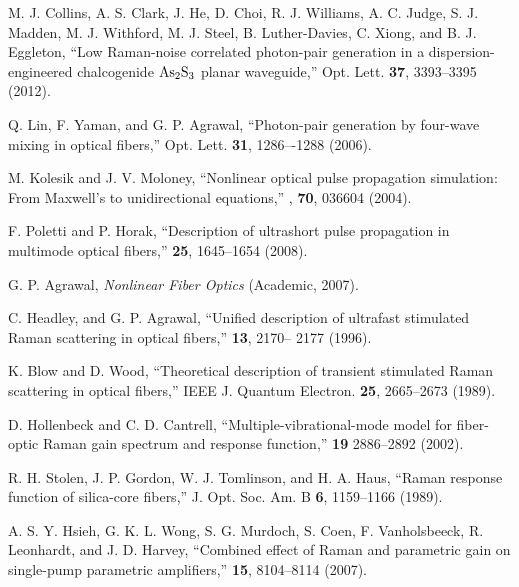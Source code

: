\documentclass[10pt,letterpaper]{article}
\begin{document}
\begin{thebibliography}{99}
 M. J. Collins, A. S. Clark, J. He, D. Choi, R. J. Williams, A. C. Judge, S. J. Madden, M. J. Withford, M. J. Steel, B. Luther-Davies, C. Xiong, and B. J. Eggleton, ``Low Raman-noise correlated photon-pair generation in a dispersion-engineered chalcogenide $\rm As_2S_3$ planar waveguide,'' Opt. Lett. \textbf{37}, 3393--3395 (2012).

 Q. Lin, F. Yaman, and G. P. Agrawal, ``Photon-pair generation by four-wave mixing in optical fibers,'' Opt. Lett. \textbf{31}, 1286–-1288 (2006).


 M. Kolesik and J. V. Moloney, ``Nonlinear optical pulse propagation simulation: From Maxwell’s to unidirectional equations,'' \pre, \textbf{70}, 036604 (2004).

 F. Poletti and P. Horak, ``Description of ultrashort pulse propagation in multimode optical fibers,'' \josab \textbf{25}, 1645--1654 (2008).

 G. P. Agrawal, \textit{Nonlinear Fiber Optics} (Academic, 2007).

 C. Headley, and G. P. Agrawal, ``Unified description of ultrafast stimulated Raman scattering in optical fibers,'' \josab \textbf{13}, 2170-- 2177 (1996).


 K. Blow and D. Wood, ``Theoretical description of transient stimulated Raman scattering in optical fibers,'' IEEE J. Quantum Electron. \textbf{25}, 2665--2673 (1989).

 D. Hollenbeck and C. D. Cantrell, ``Multiple-vibrational-mode model for fiber-optic Raman gain spectrum and response function,'' \josab \textbf{19} 2886--2892 (2002).

 R. H. Stolen, J. P. Gordon, W. J. Tomlinson, and H. A. Haus, ``Raman response function of silica-core fibers,'' J. Opt. Soc. Am. B \textbf{6}, 1159--1166 (1989).

 A. S. Y. Hsieh, G. K. L. Wong, S. G. Murdoch, S. Coen, F. Vanholsbeeck, R. Leonhardt, and J. D. Harvey, ``Combined effect of Raman and parametric gain on single-pump parametric amplifiers,'' \opex \textbf{15}, 8104--8114 (2007).


\end{thebibliography}
\end{document}

